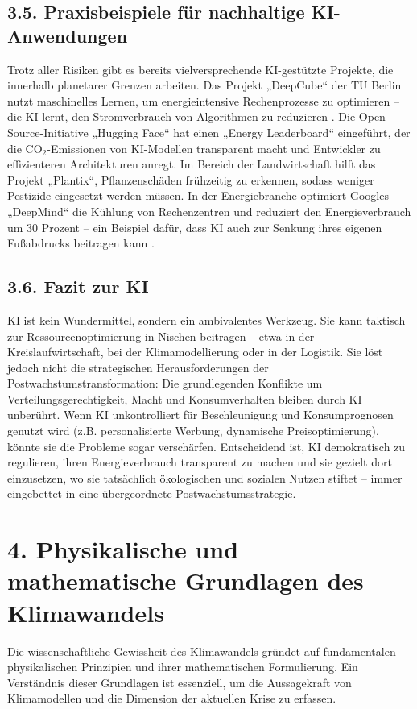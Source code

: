\documentclass[12pt, a4paper]{article}
\begin{document}
	\subsection*{3.5. Praxisbeispiele für nachhaltige KI-Anwendungen}
	Trotz aller Risiken gibt es bereits vielversprechende KI-gestützte Projekte, die
	innerhalb planetarer Grenzen arbeiten.
	Das Projekt „DeepCube“ der TU Berlin nutzt
	maschinelles Lernen, um energieintensive Rechenprozesse zu optimieren – die KI lernt,
	den Stromverbrauch von Algorithmen zu reduzieren \cite{deepcube2024}.
	Die
	Open-Source-Initiative „Hugging Face“ hat einen „Energy Leaderboard“ eingeführt, der
	die CO$_2$-Emissionen von KI-Modellen transparent macht und Entwickler zu effizienteren
	Architekturen anregt.
	Im Bereich der Landwirtschaft hilft das Projekt „Plantix“,
	Pflanzenschäden frühzeitig zu erkennen, sodass weniger Pestizide eingesetzt werden
	müssen.
	In der Energiebranche optimiert Googles „DeepMind“ die Kühlung von Rechenzentren
	und reduziert den Energieverbrauch um 30 Prozent – ein Beispiel dafür, dass KI auch
	zur Senkung ihres eigenen Fußabdrucks beitragen kann \cite{deepmind2018}.
	
	\subsection*{3.6. Fazit zur KI}
	KI ist kein Wundermittel, sondern ein ambivalentes Werkzeug.
	Sie kann taktisch zur
	Ressourcenoptimierung in Nischen beitragen – etwa in der Kreislaufwirtschaft, bei
	der Klimamodellierung oder in der Logistik.
	Sie löst jedoch nicht die strategischen
	Herausforderungen der Postwachstumstransformation: Die grundlegenden Konflikte um
	Verteilungsgerechtigkeit, Macht und Konsumverhalten bleiben durch KI unberührt.
	Wenn KI unkontrolliert für Beschleunigung und Konsumprognosen genutzt wird (z.B.
	personalisierte Werbung, dynamische Preisoptimierung), könnte sie die Probleme sogar
	verschärfen.
	Entscheidend ist, KI demokratisch zu regulieren, ihren Energieverbrauch
	transparent zu machen und sie gezielt dort einzusetzen, wo sie tatsächlich ökologischen
	und sozialen Nutzen stiftet – immer eingebettet in eine übergeordnete Postwachstumsstrategie.
	
	\section*{4. Physikalische und mathematische Grundlagen des Klimawandels}
	
	Die wissenschaftliche Gewissheit des Klimawandels gründet auf fundamentalen physikalischen
	Prinzipien und ihrer mathematischen Formulierung.
	Ein Verständnis dieser Grundlagen ist
	essenziell, um die Aussagekraft von Klimamodellen und die Dimension der aktuellen Krise
	zu erfassen.
	
\end{document}
